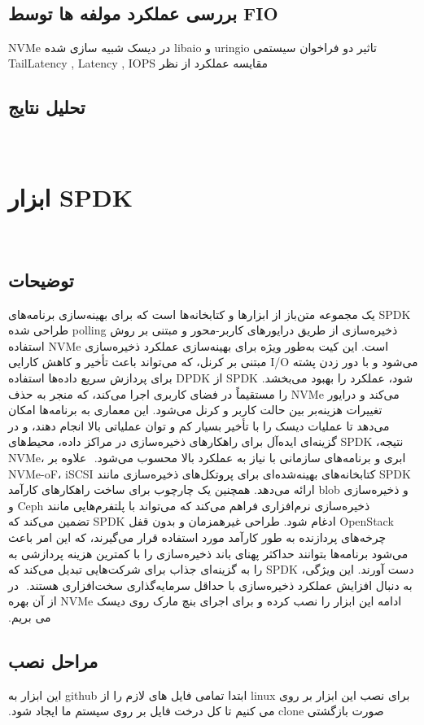 ‫
‫‫\subsection*{بررسی عملکرد مولفه ها توسط FIO}
‫
‫
‫تاثیر دو فراخوان سیستمی uringio و libaio در دیسک شبیە سازی شده NVMe
‫
‫مقایسه عملکرد از نظر TailLatency , Latency , IOPS
‫
‫
‫‫\subsection*{تحلیل نتایج}
‫
‫
‫‫\section{ابزار SPDK}
‫‫\subsection*{توضیحات}
‫
‫SPDK یک مجموعه متن‌باز از ابزارها و کتابخانه‌ها است که برای بهینه‌سازی برنامه‌های ذخیره‌سازی از طریق درایورهای کاربر-محور و مبتنی بر روش polling طراحی شده است. این کیت به‌طور ویژه برای بهینه‌سازی عملکرد ذخیره‌سازی NVMe استفاده می‌شود و با دور زدن پشته I/O مبتنی بر کرنل، که می‌تواند باعث تأخیر و کاهش کارایی شود، عملکرد را بهبود می‌بخشد. SPDK از DPDK برای پردازش سریع داده‌ها استفاده می‌کند و درایور NVMe را مستقیماً در فضای کاربری اجرا می‌کند، که منجر به حذف تغییرات هزینه‌بر بین حالت کاربر و کرنل می‌شود. این معماری به برنامه‌ها امکان می‌دهد تا عملیات دیسک را با تأخیر بسیار کم و توان عملیاتی بالا انجام دهند، و در نتیجه، SPDK گزینه‌ای ایده‌آل برای راهکارهای ذخیره‌سازی در مراکز داده، محیط‌های ابری و برنامه‌های سازمانی با نیاز به عملکرد بالا محسوب می‌شود.
‫
‫علاوه بر NVMe، SPDK کتابخانه‌های بهینه‌شده‌ای برای پروتکل‌های ذخیره‌سازی مانند   NVMe-oF، iSCSI و ذخیره‌سازی blob ارائه می‌دهد. همچنین یک چارچوب برای ساخت راهکارهای کارآمد ذخیره‌سازی نرم‌افزاری فراهم می‌کند که می‌تواند با پلتفرم‌هایی مانند Ceph و OpenStack ادغام شود. طراحی غیرهمزمان و بدون قفل SPDK تضمین می‌کند که چرخه‌های پردازنده به طور کارآمد مورد استفاده قرار می‌گیرند، که این امر باعث می‌شود برنامه‌ها بتوانند حداکثر پهنای باند ذخیره‌سازی را با کمترین هزینه پردازشی به دست آورند. این ویژگی، SPDK را به گزینه‌ای جذاب برای شرکت‌هایی تبدیل می‌کند که به دنبال افزایش عملکرد ذخیره‌سازی با حداقل سرمایه‌گذاری سخت‌افزاری هستند.
‫
‫در ادامه این ابزار را نصب کرده و برای اجرای بنچ مارک روی دیسک NVMe از آن بهره می بریم.
‫
‫
‫
‫
‫
‫
‫
‫‫\subsection*{مراحل نصب}
‫برای نصب این ابزار بر روی linux ابتدا تمامی فایل های لازم را از github این ابزار به صورت بازگشتی clone می کنیم تا کل درخت فایل بر روی سیستم ما ایجاد شود.

